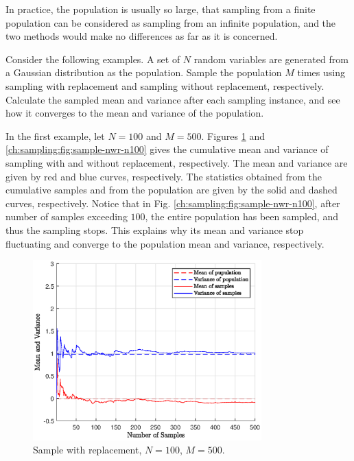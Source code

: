 In practice, the population is usually so large, that sampling from a finite population can be considered as sampling from an infinite population, and the two methods would make no differences as far as it is concerned.

Consider the following examples. A set of $N$ random variables are generated from a Gaussian distribution as the population. Sample the population $M$ times using sampling with replacement and sampling without replacement, respectively. Calculate the sampled mean and variance after each sampling instance, and see how it converges to the mean and variance of the population.

In the first example, let $N=100$ and $M=500$. Figures \ref{ch:sampling:fig:sample-wr-n100} and \ref{ch:sampling:fig:sample-nwr-n100} gives the cumulative mean and variance of sampling with and without replacement, respectively. The mean and variance are given by red and blue curves, respectively. The statistics obtained from the cumulative samples and from the population are given by the solid and dashed curves, respectively. Notice that in Fig. \ref{ch:sampling:fig:sample-nwr-n100}, after number of samples exceeding $100$, the entire population has been sampled, and thus the sampling stops. This explains why its mean and variance stop fluctuating and converge to the population mean and variance, respectively.

\begin{figure}
	\centering
	\includegraphics[width=250pt]{chapters/ch-sampling/figures/sample-wr-n100.eps}
	\caption{Sample with replacement, $N=100$, $M=500$.} \label{ch:sampling:fig:sample-wr-n100}
\end{figure}

